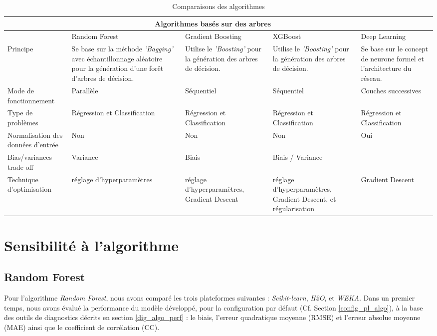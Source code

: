 \begin{landscape}
\begin{table}[ht]
    \centering
    \begin{tabular}{ |p{3cm}|p{4.5cm}|p{4.5cm}|p{4.5cm}|p{4.5cm}|  }
     \hline
     & \multicolumn{3}{|c|}{Algorithmes basés sur des arbres} & \\
     \hline
     & Random Forest & Gradient Boosting & XGBoost & Deep Learning \\
     \hline
      Principe
      & Se base sur la méthode \textit{'Bagging'} avec échantillonnage aléatoire pour la génération d'une forêt d'arbres de décision.
      & Utilise le \textit{'Boosting'} pour la génération des arbres de décision. 
      & Utilise le \textit{'Boosting'} pour la génération des arbres de décision.
      & Se base sur le concept de neurone formel et l'architecture du réseau. \\
      \hline
      Mode de fonctionnement
      & Parallèle
      & Séquentiel
      & Séquentiel
      & Couches successives\\
      \hline
      Type de problèmes
      & Régression et Classification
      & Régression et Classification
      & Régression et Classification
      & Régression et Classification\\
      \hline
      Normalisation des données d'entrée
      & Non
      & Non
      & Non
      & Oui \\
      \hline
      Bias/variances trade-off
      & Variance
      & Biais
      & Biais / Variance
      & \\
      \hline
      Technique d'optimisation
      & réglage d'hyperparamètres
      & réglage d'hyperparamètres, Gradient Descent
      & réglage d'hyperparamètres, Gradient Descent, et régularisation
      & Gradient Descent\\
    \hline
    \end{tabular}
    \caption{Comparaisons des algorithmes}
    \label{comp_algo}
\end{table}
\end{landscape}


\section{Sensibilité à l'algorithme}
\subsection*{Random Forest}
Pour l'algorithme \textit{Random Forest}, nous avons comparé les trois plateformes suivantes : \textit{Scikit-learn}, \textit{H2O}, et \textit{WEKA}. Dans un premier temps, nous avons évalué la performance du modèle développé, pour la configuration par défaut (Cf. Section \ref{config_pl_algo}), à la base des outils de diagnostics décrits en section \ref{dig_algo_perf} : le biais, l'erreur quadratique moyenne (RMSE) et l'erreur absolue moyenne (MAE) ainsi que le coefficient de corrélation (CC).\\ 

